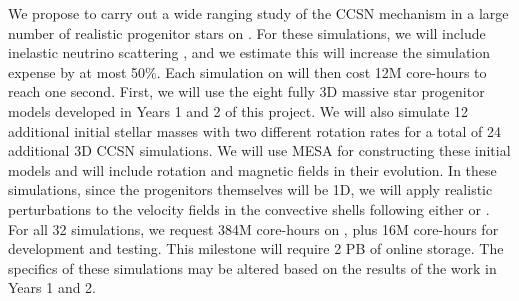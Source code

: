 We propose to carry out a wide ranging study of the CCSN mechanism in a large number of realistic progenitor stars on \aurora.
For these simulations, we will include inelastic neutrino scattering \citep{OConnor:2015, Burrows:2016}, and we estimate this will increase the simulation expense by at most 50\%.
Each simulation on \aurora will then cost 12M core-hours to reach one second.
First, we will use the eight fully 3D massive star progenitor models developed in Years 1 and 2 of this project.
We will also simulate 12 additional initial stellar masses with two different rotation rates for a total of 24 additional 3D CCSN simulations.
We will use MESA for constructing these initial models and will include rotation and magnetic fields in their evolution.
In these simulations, since the progenitors themselves will be 1D, we will apply realistic perturbations to the velocity fields in the convective shells following either \citet{Muller:2015} or \citet{Chatzopoulos:2014}.
For all 32 simulations, we request 384M core-hours on \aurora, plus 16M core-hours for development and testing.
This milestone will require 2 PB of online storage.
The specifics of these simulations may be altered based on the results of the work in Years 1 and 2.


%
%


